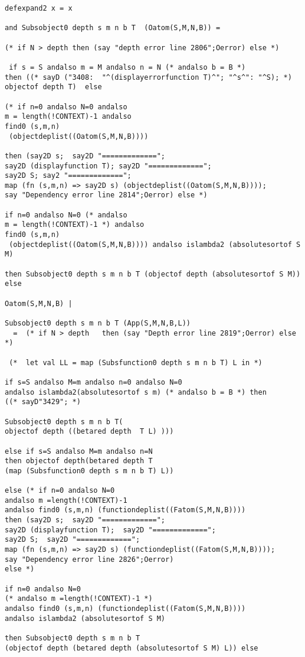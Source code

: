 \documentclass[12pt]{article}
\begin{document}
\begin{verbatim}
defexpand2 x = x

and Subsobject0 depth s m n b T  (Oatom(S,M,N,B)) =

(* if N > depth then (say "depth error line 2806";Oerror) else *)

 if s = S andalso m = M andalso n = N (* andalso b = B *)
then ((* sayD ("3408:  "^(displayerrorfunction T)^"; "^s^": "^S); *) objectof depth T)  else 

(* if n=0 andalso N=0 andalso 
m = length(!CONTEXT)-1 andalso
find0 (s,m,n)
 (objectdeplist((Oatom(S,M,N,B))))
 
then (say2D s;  say2D "=============";
say2D (displayfunction T); say2D "=============";
say2D S; say2 "=============";
map (fn (s,m,n) => say2D s) (objectdeplist((Oatom(S,M,N,B))));
say "Dependency error line 2814";Oerror) else *)

if n=0 andalso N=0 (* andalso 
m = length(!CONTEXT)-1 *) andalso
find0 (s,m,n)
 (objectdeplist((Oatom(S,M,N,B)))) andalso islambda2 (absolutesortof S M)
 
then Subsobject0 depth s m n b T (objectof depth (absolutesortof S M)) else

Oatom(S,M,N,B) |

Subsobject0 depth s m n b T (App(S,M,N,B,L)) 
  =  (* if N > depth   then (say "Depth error line 2819";Oerror) else *)
  
 (*  let val LL = map (Subsfunction0 depth s m n b T) L in *)

if s=S andalso M=m andalso n=0 andalso N=0  
andalso islambda2(absolutesortof s m) (* andalso b = B *) then 
((* sayD"3429"; *)

Subsobject0 depth s m n b T(
objectof depth ((betared depth  T L) )))

else if s=S andalso M=m andalso n=N  
then objectof depth(betared depth T 
(map (Subsfunction0 depth s m n b T) L))

else (* if n=0 andalso N=0 
andalso m =length(!CONTEXT)-1
andalso find0 (s,m,n) (functiondeplist((Fatom(S,M,N,B))))
then (say2D s;  say2D "=============";
say2D (displayfunction T);  say2D "=============";
say2D S;  say2D "=============";
map (fn (s,m,n) => say2D s) (functiondeplist((Fatom(S,M,N,B))));
say "Dependency error line 2826";Oerror)
else *) 

if n=0 andalso N=0 
(* andalso m =length(!CONTEXT)-1 *)
andalso find0 (s,m,n) (functiondeplist((Fatom(S,M,N,B)))) 
andalso islambda2 (absolutesortof S M)

then Subsobject0 depth s m n b T 
(objectof depth (betared depth (absolutesortof S M) L)) else


\end{verbatim}
\end{document}
